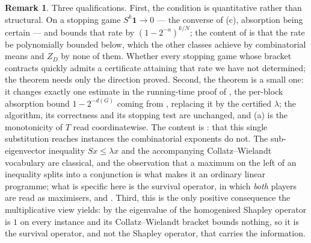 \documentclass[11pt]{article}
\theoremstyle{plain}
\theoremstyle{definition}
\newtheorem{remark}[theorem]{Remark}
\newcommand{\bbone}{\mathbf{1}}
\begin{document}
\begin{remark}\label{rem:escape-class}
Three qualifications. First, the condition is quantitative rather than
structural. On a stopping game $S^k\bbone\to0$ --- the converse of
(c), absorption being certain --- and
 bounds that rate by $(1-2^{-a})^{k/N}$; the
content of  is that the rate be polynomially
bounded below, which the other classes achieve by combinatorial means
and $Z_D$ by none of them. Whether every stopping game whose bracket
contracts quickly admits a certificate attaining that rate we have not
determined; the theorem needs only the direction proved. Second, the theorem is a small one: it changes exactly one estimate in
the running-time proof of , the per-block absorption
bound $1-2^{-d(G)}$ coming from , replacing it
by the certified $\lambda$; the algorithm, its correctness and its
stopping test are unchanged, and (a) is the
monotonicity of $T$ read coordinatewise. The content is
: that this single substitution reaches
instances the combinatorial exponents do not. The
sub-eigenvector inequality $Sx\le\lambda x$ and the accompanying
Collatz--Wielandt vocabulary are classical, and the observation that a
maximum on the left of an inequality splits into a conjunction is what
makes it an ordinary linear programme; what is specific here is the
survival operator, in which \emph{both} players are read as maximisers,
and . Third, this is the only positive
consequence the multiplicative view yields: by  the
eigenvalue of the homogenised Shapley operator is $1$ on every instance
and its Collatz--Wielandt bracket bounds nothing, so it is the survival
operator, and not the Shapley operator, that carries the information.


\end{remark}
\end{document}

